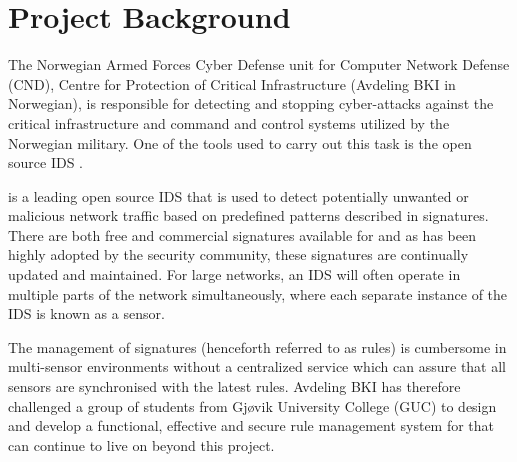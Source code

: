 \section{Project Background}
The Norwegian Armed Forces Cyber Defense unit for Computer Network Defense
(CND), Centre for Protection of Critical Infrastructure (Avdeling BKI in
Norwegian), is responsible for detecting and stopping cyber-attacks against the
critical infrastructure and command and control systems utilized by the Norwegian military.
One of the tools used to carry out this task is the open source IDS \snort{}
\cite{Snort}.

\snort{} is a leading \cite{snort_community} open source IDS that is used to
detect potentially unwanted or malicious network traffic based on predefined patterns described in
signatures. There are both free and commercial signatures available for
\snort{} and as \snort{} has been highly adopted by the security community,
these signatures are continually updated and maintained. For large networks, an
IDS will often operate in multiple parts of the network simultaneously, where each separate instance of the IDS is known as a
sensor. 

The management of \snort{} signatures (henceforth referred to as
rules) is cumbersome in multi-sensor environments without a centralized service
which can assure that all sensors are synchronised with the latest rules.
Avdeling BKI has therefore challenged a group of students from Gjøvik University
College (GUC) to design and develop a functional, effective and secure
rule management system for \snort{} that can continue to live on beyond this project.


% 
